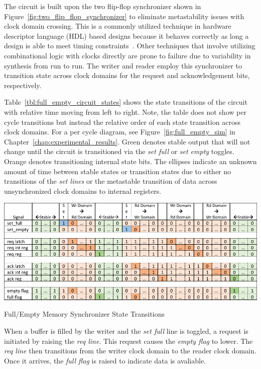         The circuit is built upon the two flip-flop synchronizer shown in Figure~\ref{fig:two_flip_flop_synchronizer} to eliminate metastability issues with clock domain crossing. This is a commonly utilized technique in hardware descriptor language (HDL) based designs because it behaves correctly as long a design is able to meet timing constraints~\cite{Cummings2008, Ginosar2011}. Other techniques that involve utilizing combinational logic with clocks directly are prone to failure due to variability in synthesis from run to run. The writer and reader employ this synchronizer to transition state across clock domains for the request and acknowledgement bits, respectively.

        Table~\ref{tbl:full_empty_circuit_states} shows the state transitions of the circuit with relative time moving from left to right. Note, the table does not show per cycle transitions but instead the relative order of each state transition across clock domains. For a per cycle diagram, see Figure~\ref{fig:full_empty_sim} in Chapter~\ref{chap:experimental_results}. Green denotes stable output that will not change until the circuit is transitioned via the {\it set full} or {\it set empty} toggles. Orange denotes transitioning internal state bits. The ellipses indicate an unknown amount of time between stable states or transition states due to either no transitions of the {\it set lines} or the metastable transition of data across unsynchronized clock domains to internal registers.

        \begin{table}
            \centering
            \includegraphics[width=1.0\textwidth]{fig/full_empty_circuit_states.pdf}
            \caption{Full/Empty Memory Synchronizer State Transitions}
            \label{tbl:full_empty_circuit_states}
        \end{table}

        When a buffer is filled by the writer and the {\it set full} line is toggled, a request is initiated by raising the {\it req line}. This request causes the {\it empty flag} to lower. The {\it req line} then transitions from the writer clock domain to the reader clock domain. Once it arrives, the {\it full flag} is raised to indicate data is avaliable.

